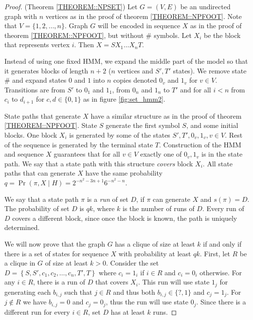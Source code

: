 \begin{proof}(Theorem \ref{THEOREM::NPSET})
Let $G=(V,E)$ be an undirected graph with $n$ vertices as in the proof of theorem
\ref{THEOREM::NPFOOT}. Note that $V = \{1, 2, \dots, n\}$. Graph $G$ will be encoded in
sequence $X$ as in the proof of theorem \ref{THEOREM::NPFOOT}, but without $\#$ symbols.
Let $X_i$ be the block that represents vertex $i$. Then $X=SX_1\dots X_nT$.

Instead of using one fixed HMM, we expand the middle part of the model so that it
generates blocks of length $n+2$ ($n$ vertices and $S', T'$ states). We remove
state $\#$ and expand states $0$ and $1$ into $n$ copies 
denoted $0_v$ and $1_v$ for $v \in V$.  Transitions are from $S'$ to $0_1$ and
$1_1$, from $0_n$ and $1_n$ to $T'$ and for all $i<n$ from $c_i$ to $d_{i+1}$
for $c,d\in \{0, 1\}$ as in figure  \ref{fig:set_hmm2}. 


State paths that generate $X$ have a similar structure as in the proof of theorem
\ref{THEOREM::NPFOOT}. State $S$ generate the first symbol $S$, and some initial blocks.
One block $X_i$ is generated by some of the states $S', T', 0_v, 1_v, v\in
V$.  Rest of the sequence is generated by the terminal state $T$.  Construction of
the HMM and sequence $X$ guarantees that for all $v\in V$ exactly one of $0_v, 1_v$
is in the state path. 
We say that a state path with this structure
\emph{covers} block $X_i$. All state paths that can generate $X$ have the same
probability $q = \Pr(\pi, X\mid H) = 2^{-n^2-3n+1}6^{-n^2 - n}$.

We say that a state path $\pi$ is a \emph{run} of set $D$, if $\pi$ can generate
$X$ and $s(\pi) = D$. The probability of set $D$ is $qk$, where $k$ is the
number of runs of $D$. Every run of $D$ covers a different block, since once the
block is known, the path is uniquely determined.

We will now prove that the graph $G$ has a clique of size at least $k$ if and
only if there is a set of states for sequence $X$ with probability at least
$qk$.  First, let $R$ be a clique in $G$ of size at least $k>0$.  Consider the
set $D=\left\{S,S',{c_1},{c_2},\dots,{c_n},T',T\right\}$ where $c_i=1_i$ if
$i\in R$ and $c_i=0_i$ otherwise. For any $i\in R$, there is a run of
$D$ that covers $X_i$. This run will use state $1_j$ for generating each
$b_{i,j}$ such that $j\in R$ and thus both $b_{i,j}\in \{?,1\}$ and $c_j=1_j$.
For $j\notin R$ we have $b_{i,j}=0$ and $c_j=0_j$, thus the run will use state
$0_j$. Since there  is a different run for every $i\in R$, set $D$ has
at least $k$ runs.


\end{proof}
